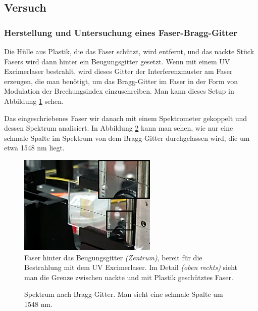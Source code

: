 \documentclass[a4paper]{article}
\begin{document}
\subsection{Versuch}
\subsubsection{Herstellung und Untersuchung eines Faser-Bragg-Gitter}

Die Hülle aus Plastik, die das Faser schützt, wird entfernt, und das nackte
Stück Fasers wird dann hinter ein Beugungsgitter gesetzt. Wenn mit einem UV
Excimerlaser bestrahlt, wird dieses Gitter der Interferenzmuster am Faser
erzeugen, die man benötigt, um das Bragg-Gitter im Faser in der Form von
Modulation der Brechungsindex einzuschreiben. Man kann dieses Setup in
Abbildung \ref{fig:gitt} sehen. 

Das eingeschriebenes Faser wir danach mit einem Spektrometer gekoppelt und
dessen Spektrum analisiert. In Abbildung \ref{fig:bragg} kann man sehen, wie
nur eine schmale Spalte im Spektrum von dem Bragg-Gitter durchgelassen wird,
die um etwa 1548 nm liegt.

\begin{figure}[H]
  \centering
  \includegraphics{./messungen/gitter.png}
  \caption{Faser hinter das Beugungsgitter \emph{(Zentrum)}, bereit für die
  Bestrahlung mit dem UV Excimerlaser. Im Detail \emph{(oben rechts)} sieht man
die Grenze zwischen nackte und mit Plastik geschütztes Faser.}
  \label{fig:gitt}
\end{figure}

\begin{figure}[H]
  \centering
  \caption{Spektrum nach Bragg-Gitter. Man sieht eine schmale Spalte um 1548
  nm.}
  \label{fig:bragg}
\end{figure}
\end{document}
